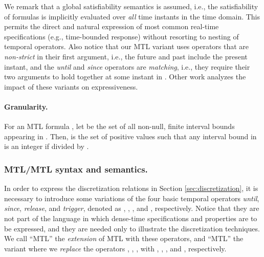 \documentclass[a4paper]{article}
\newcommand{\mtlplus}{MTL}
\newcommand{\mtlstar}{MTL}
\theoremstyle{plain}
\theoremstyle{definition}
\begin{document}
We remark that a global satisfiability semantics is assumed, i.e., the satisfiability of formulas is implicitly evaluated over \emph{all} time instants in the time domain.
This permits the direct and natural expression of most common real-time specifications (e.g., time-bounded response) without resorting to nesting of temporal operators.
Also notice that our MTL variant uses operators that are \emph{non-strict} in their first argument, i.e., the future and past include the present instant, and the \emph{until} and \emph{since} operators are \emph{matching}, i.e., they require their two arguments to hold together at some instant in .
Other work \cite{FR07-FORMATS07} analyzes the impact of these variants on expressiveness.


\paragraph{Granularity.}
For an MTL formula , let  be the set of all non-null, finite interval bounds appearing in .
Then,  is the set of positive values  such that any interval bound in  is an integer if divided by .





\subsubsection{\mtlplus{}/\mtlstar{} syntax and semantics.}
In order to express the discretization relations in Section \ref{sec:discretization}, it is necessary to introduce some variations of the four basic temporal operators \emph{until}, \emph{since}, \emph{release}, and \emph{trigger}, denoted as , , , and , respectively.
Notice that they are not part of the language in which dense-time specifications and properties are to be expressed, and they are needed only to illustrate the discretization techniques.
We call ``\mtlplus{}'' the \emph{extension} of MTL with these operators, and ``\mtlstar{}'' the variant where we \emph{replace} the operators , , ,  with , , , and , respectively.
\end{document}
